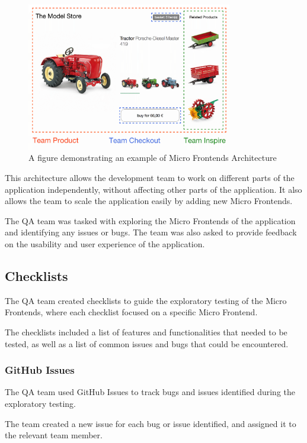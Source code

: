 \begin{figure}[H]
    \centering
    \includegraphics[width=0.8\textwidth]{project/images/three-teams.png}
    \caption{A figure demonstrating an example of Micro Frontends Architecture}
    \label{fig:microfrontends}
\end{figure}

This architecture allows the development team to work on different parts of the application independently, without affecting other parts of the application. It also allows the team to scale the application easily by adding new Micro Frontends.

The QA team was tasked with exploring the Micro Frontends of the application and identifying any issues or bugs. The team was also asked to provide feedback on the usability and user experience of the application.

\subsection{Checklists}
The QA team created checklists to guide the exploratory testing of the Micro Frontends, where each checklist focused on a specific Micro Frontend.

The checklists included a list of features and functionalities that needed to be tested, as well as a list of common issues and bugs that could be encountered.

\subsubsection{GitHub Issues}

The QA team used GitHub Issues to track bugs and issues identified during the exploratory testing.

The team created a new issue for each bug or issue identified, and assigned it to the relevant team member.

